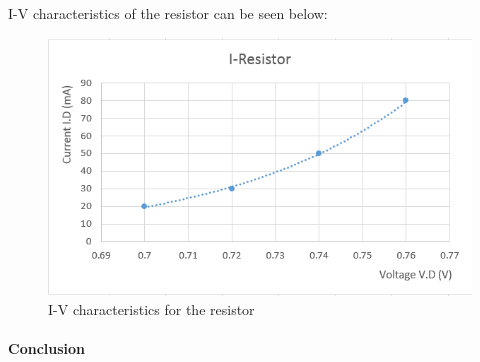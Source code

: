 \begin{flushleft}
I-V characteristics of the resistor can be seen below:
\end{flushleft}
\begin{figure}[H]
	\centering
\includegraphics[width=1\textwidth]{./images/Kacper/31b.png}
	\caption{I-V characteristics for the resistor}
\end{figure}

\paragraph*{Conclusion} \hfill \\